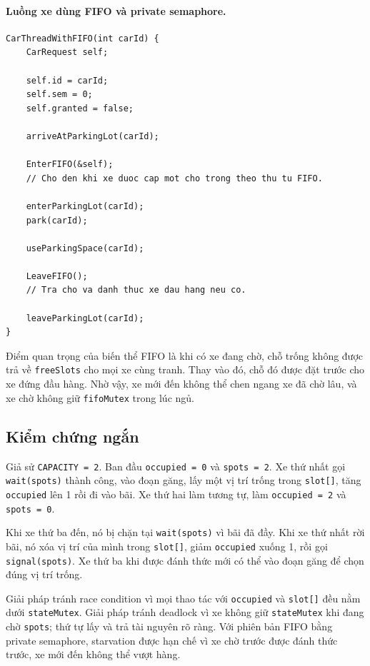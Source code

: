 \paragraph{Luồng xe dùng FIFO và private semaphore.}

\begin{lstlisting}
CarThreadWithFIFO(int carId) {
    CarRequest self;

    self.id = carId;
    self.sem = 0;
    self.granted = false;

    arriveAtParkingLot(carId);

    EnterFIFO(&self);
    // Cho den khi xe duoc cap mot cho trong theo thu tu FIFO.

    enterParkingLot(carId);
    park(carId);

    useParkingSpace(carId);

    LeaveFIFO();
    // Tra cho va danh thuc xe dau hang neu co.

    leaveParkingLot(carId);
}
\end{lstlisting}

Điểm quan trọng của biến thể FIFO là khi có xe đang chờ, chỗ trống không được
trả về \texttt{freeSlots} cho mọi xe cùng tranh. Thay vào đó, chỗ đó được
đặt trước cho xe đứng đầu hàng. Nhờ vậy, xe mới đến không thể chen ngang
xe đã chờ lâu, và xe chờ không giữ \texttt{fifoMutex} trong lúc ngủ.

\subsection{Kiểm chứng ngắn}

Giả sử \texttt{CAPACITY = 2}. Ban đầu \texttt{occupied = 0} và
\texttt{spots = 2}. Xe thứ nhất gọi \texttt{wait(spots)} thành công, vào
đoạn găng, lấy một vị trí trống trong \texttt{slot[]}, tăng
\texttt{occupied} lên 1 rồi đi vào bãi. Xe thứ hai làm tương tự, làm
\texttt{occupied = 2} và \texttt{spots = 0}.

Khi xe thứ ba đến, nó bị chặn tại \texttt{wait(spots)} vì bãi đã đầy. Khi
xe thứ nhất rời bãi, nó xóa vị trí của mình trong \texttt{slot[]}, giảm
\texttt{occupied} xuống 1, rồi gọi \texttt{signal(spots)}. Xe thứ ba khi
được đánh thức mới có thể vào đoạn găng để chọn đúng vị trí trống.

Giải pháp tránh race condition vì mọi thao tác với \texttt{occupied} và
\texttt{slot[]} đều nằm dưới \texttt{stateMutex}. Giải pháp tránh deadlock
vì xe không giữ \texttt{stateMutex} khi đang chờ \texttt{spots}; thứ tự lấy
và trả tài nguyên rõ ràng. Với phiên bản FIFO bằng private semaphore, starvation được hạn
chế vì xe chờ trước được đánh thức trước, xe mới đến không thể vượt hàng.

